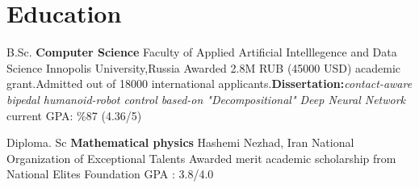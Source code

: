 \section{Education}
            {B.Sc. \textbf{Computer Science}}
            {Faculty of Applied Artificial Intelllegence and Data Science}
            {Innopolis University,Russia}
            {Awarded 2.8M RUB (45000 USD) academic grant.Admitted out of 18000 international applicants.\textbf{Dissertation:}\textit{contact-aware bipedal humanoid-robot control based-on "Decompositional" Deep Neural Network} }
            {current GPA: \%87 (4.36/5)} 
  
    \vspace{10pt}
    
            {Diploma. Sc \textbf{Mathematical physics}}
            {Hashemi Nezhad, Iran}
            {National Organization of Exceptional Talents}
            {Awarded merit academic scholarship from National Elites Foundation }
            {GPA : 3.8/4.0}